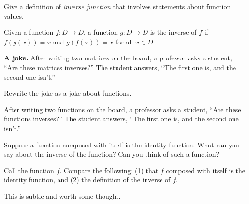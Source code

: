 \documentclass{ximera}
\newcommand{\Z}{\mathbb Z}
\begin{document}
\begin{question}
Give a definition of \emph{inverse function} that involves statements about function values.    
\begin{freeResponse}
Given a function $f:D\rightarrow D$, a function $g:D\rightarrow D$ is the inverse of $f$ if $f(g(x)) = x$ and $g(f(x)) = x$ for all $x\in D$.  
\end{freeResponse}
\end{question}

\textbf{A joke.}  After writing two matrices on the board, a professor asks a student, ``Are these matrices inverses?''  The student answers, ``The first one is, and the second one isn't.''  

\begin{question}
Rewrite the joke as a joke about functions.  
\begin{freeResponse}
After writing two functions on the board, a professor asks a student, ``Are these functions inverses?''  The student answers, ``The first one is, and the second one isn't.''  
\end{freeResponse}
\end{question}

\begin{question}
Suppose a function composed with itself is the identity function.  What can you say about the inverse of the function?  Can you think of such a function?  
\begin{hint}
Call the function $f$.  Compare the following:  (1) that $f$ composed with itself is the identity function, and (2) the definition of the inverse of $f$.
\end{hint}
\begin{freeResponse}
This is subtle and worth some thought.  
\end{freeResponse}
\end{question}

%
\end{document}
